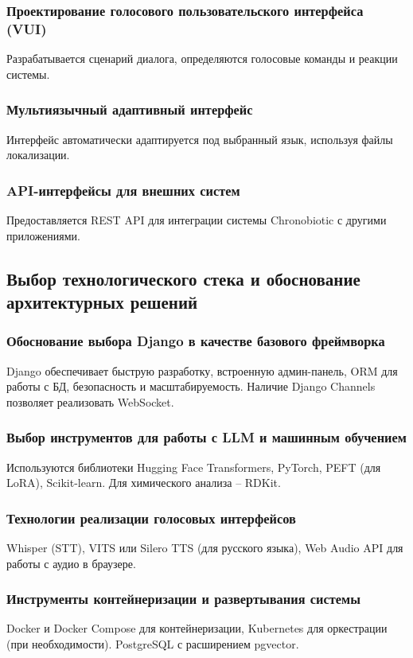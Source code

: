\documentclass[a4paper,14pt]{extarticle}
\begin{document}
	\subsubsection{Проектирование голосового пользовательского интерфейса (VUI)}
	Разрабатывается сценарий диалога, определяются голосовые команды и реакции системы.
	
	\subsubsection{Мультиязычный адаптивный интерфейс}
	Интерфейс автоматически адаптируется под выбранный язык, используя файлы локализации.
	
	\subsubsection{API-интерфейсы для внешних систем}
	Предоставляется REST API для интеграции системы Chronobiotic с другими приложениями.
	
	\subsection{Выбор технологического стека и обоснование архитектурных решений}
	
	\subsubsection{Обоснование выбора Django в качестве базового фреймворка}
	Django обеспечивает быструю разработку, встроенную админ-панель, ORM для работы с БД, безопасность и масштабируемость. Наличие Django Channels позволяет реализовать WebSocket.
	
	\subsubsection{Выбор инструментов для работы с LLM и машинным обучением}
	Используются библиотеки Hugging Face Transformers, PyTorch, PEFT (для LoRA), Scikit-learn. Для химического анализа – RDKit.
	
	\subsubsection{Технологии реализации голосовых интерфейсов}
	Whisper (STT), VITS или Silero TTS (для русского языка), Web Audio API для работы с аудио в браузере.
	
	\subsubsection{Инструменты контейнеризации и развертывания системы}
	Docker и Docker Compose для контейнеризации, Kubernetes для оркестрации (при необходимости). PostgreSQL с расширением pgvector.
	
\end{document}
